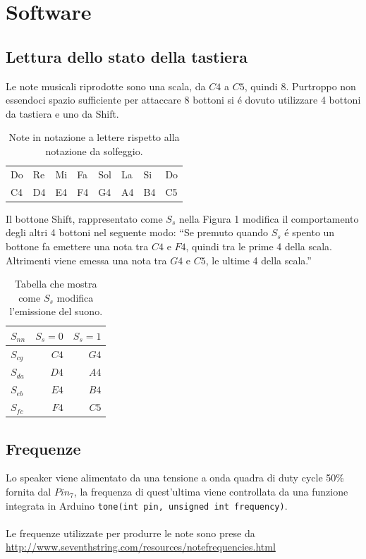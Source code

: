\documentclass[a4paper]{article}
\begin{document}
	\section{Software}
		\subsection{Lettura dello stato della tastiera}
			Le note musicali riprodotte sono una scala, da $C4$ a $C5$, quindi 8.
			Purtroppo non essendoci spazio sufficiente per attaccare 8 bottoni si é dovuto
			utilizzare 4 bottoni da tastiera e uno da Shift.
			
			\begin{table}[H]
				\centering \begin{tabular}{ | l l l l l l l l | }
				\hline
				Do & Re & Mi & Fa & Sol & La & Si & Do \\
				C4 & D4 & E4 & F4 & G4 & A4 & B4 & C5	\\
				\hline
				\end{tabular}
				\caption{Note in notazione a lettere rispetto alla notazione da solfeggio.}
			\end{table}
			
			Il bottone Shift, rappresentato come $S_s$ nella Figura 1 modifica il comportamento
			degli altri 4 bottoni nel seguente modo:
			``Se premuto quando $S_s$ é spento un bottone fa emettere una nota tra $C4$ e $F4$,
			quindi tra le prime 4 della scala. Altrimenti viene emessa una nota tra $G4$ e $C5$,
			le ultime 4 della scala.''
			
			\begin{table}[h]
				\begin{center} \begin{tabular}{ | l | r r | }
					\hline
					$S_{nn}$		&		$S_s = 0$	&	$S_s = 1$ \\
					\hline
					$S_{cg}$	&	$C4$	&	$G4$	\\
					$S_{da}$	&	$D4$	&	$A4$	\\
					$S_{eb}$	&	$E4$	&	$B4$	\\
					$S_{fc}$	&	$F4$	&	$C5$	\\
					\hline
				\end{tabular} \end{center}
				\caption{Tabella che mostra come $S_s$ modifica l'emissione del suono.}
			\end{table}

		\subsection{Frequenze}
			Lo speaker viene alimentato da una tensione a onda quadra di duty cycle 50\% fornita
			dal $Pin_7$, la frequenza di quest'ultima viene controllata da una funzione integrata in Arduino
			\texttt{tone(int pin, unsigned int frequency)}.\\\\
			Le frequenze utilizzate per produrre le note sono prese da \\
			\url{http://www.seventhstring.com/resources/notefrequencies.html}
			
\end{document}
